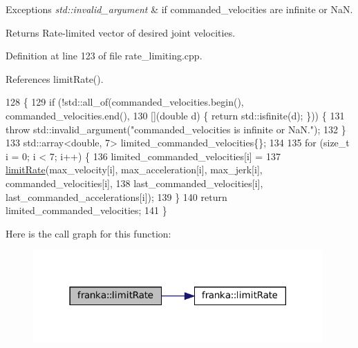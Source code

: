 \begin{DoxyExceptions}{Exceptions}
{\em std\+::invalid\+\_\+argument} & if commanded\+\_\+velocities are infinite or NaN.\\
\hline
\end{DoxyExceptions}
\begin{DoxyReturn}{Returns}
Rate-\/limited vector of desired joint velocities. 
\end{DoxyReturn}


Definition at line 123 of file rate\+\_\+limiting.\+cpp.



References limit\+Rate().


\begin{DoxyCode}
128                                                                                          \{
129   \textcolor{keywordflow}{if} (!std::all\_of(commanded\_velocities.begin(), commanded\_velocities.end(),
130                    [](\textcolor{keywordtype}{double} d) \{ \textcolor{keywordflow}{return} std::isfinite(d); \})) \{
131     \textcolor{keywordflow}{throw} std::invalid\_argument(\textcolor{stringliteral}{"commanded\_velocities is infinite or NaN."});
132   \}
133   std::array<double, 7> limited\_commanded\_velocities\{\};
134 
135   \textcolor{keywordflow}{for} (\textcolor{keywordtype}{size\_t} i = 0; i < 7; i++) \{
136     limited\_commanded\_velocities[i] =
137         \hyperlink{namespacefranka_1_1anonymous__namespace_02rate__limiting_8cpp_03_aa1d64bbd7b303af83e6a76b92298d73a}{limitRate}(max\_velocity[i], max\_acceleration[i], max\_jerk[i], commanded\_velocities[i],
138                   last\_commanded\_velocities[i], last\_commanded\_accelerations[i]);
139   \}
140   \textcolor{keywordflow}{return} limited\_commanded\_velocities;
141 \}
\end{DoxyCode}
Here is the call graph for this function\+:
\nopagebreak
\begin{figure}[H]
\begin{center}
\leavevmode
\includegraphics[width=314pt]{namespacefranka_aa778ddc24969b8eac4f26e86858dfb5a_cgraph}
\end{center}
\end{figure}
\mbox{\label{namespacefranka_ac6ebb1c79c15c7d00a2fa621a968d622}} 
